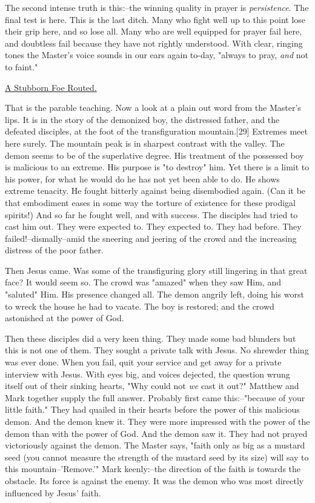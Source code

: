 The second intense truth is this:--the winning quality in prayer is
\textit{persistence}. The final test is here. This is the last ditch. Many who
fight well up to this point lose their grip here, and so lose all. Many
who are well equipped for prayer fail here, and doubtless fail because
they have not rightly understood. With clear, ringing tones the Master's
voice sounds in our ears again to-day, "always to pray, \textit{and} not to
faint."



\underline{A Stubborn Foe Routed.}


That is the parable teaching. Now a look at a plain out word from the
Master's lips. It is in the story of the demonized boy, the distressed
father, and the defeated disciples, at the foot of the transfiguration
mountain.[29] Extremes meet here surely. The mountain peak is in sharpest
contrast with the valley. The demon seems to be of the superlative degree.
His treatment of the possessed boy is malicious to an extreme. His purpose
is "to destroy" him. Yet there is a limit to his power, for what he would
do he has not yet been able to do. He shows extreme tenacity. He fought
bitterly against being disembodied again. (Can it be that embodiment eases
in some way the torture of existence for these prodigal spirits!) And so
far he fought well, and with success. The disciples had tried to cast him
out. They were expected to. They expected to. They had before. They
failed!--dismally--amid the sneering and jeering of the crowd and the
increasing distress of the poor father.

Then Jesus came. Was some of the transfiguring glory still lingering in
that great face? It would seem so. The crowd was "amazed" when they saw
Him, and "saluted" Him. His presence changed all. The demon angrily left,
doing his worst to wreck the house he had to vacate. The boy is restored;
and the crowd astonished at the power of God.

Then these disciples did a very keen thing. They made some bad blunders
but this is not one of them. They sought a private talk with Jesus. No
shrewder thing was ever done. When you fail, quit your service and get
away for a private interview with Jesus. With eyes big, and voices
dejected, the question wrung itself out of their sinking hearts, "Why
could not \textit{we} cast it out?" Matthew and Mark together supply the full
answer. Probably first came this:--"because of your little faith." They
had quailed in their hearts before the power of this malicious demon. And
the demon knew it. They were more impressed with the power of the demon
than with the power of God. And the demon saw it. They had not prayed
victoriously against the demon. The Master says, "faith only as big as a
mustard seed (you cannot measure the strength of the mustard seed by its
size) will say to this mountain--'Remove.'" Mark keenly:--the direction of
the faith is towards the obstacle. Its force is against the enemy. It was
the demon who was most directly influenced by Jesus' faith.

